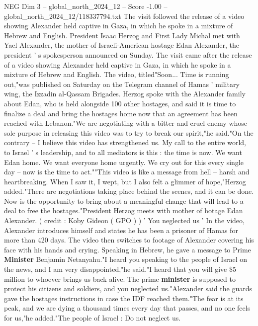 \begin{textsample}{NEG Dim 3 – global\_north\_2024\_12 – Score -1.00 – global\_north\_2024\_12/118337794.txt}  \label{ex:f3_neg_226}
The visit followed the release of a video showing Alexander held captive in Gaza, in which he spoke in a mixture of Hebrew and English.
President Isaac Herzog and First Lady Michal met with Yael Alexander, the mother of Israeli-American hostage Edan Alexander, the president ' s spokesperson announced on Sunday.
The visit came after the release of a video showing Alexander held captive in Gaza, in which he spoke in a mixture of Hebrew and English.
The video, titled"Soon...
Time is running out,"was published on Saturday on the Telegram channel of Hamas ' military wing, the Izzadin al-Qassam Brigades.
Herzog spoke with the Alexander family about Edan, who is held alongside 100 other hostages, and said it is time to finalize a deal and bring the hostages home now that an agreement has been reached with Lebanon."We are negotiating with a bitter and cruel enemy whose sole purpose in releasing this video was to try to break our spirit,"he said."On the contrary -- I believe this video has strengthened us.
My call to the entire world, to Israel ' s leadership, and to all mediators is this : the time is now.
We want Edan home.
We want everyone home urgently.
We cry out for this every single day -- now is the time to act.""This video is like a message from hell -- harsh and heartbreaking.
When I saw it, I wept, but I also felt a glimmer of hope,"Herzog added."There are negotiations taking place behind the scenes, and it can be done.
Now is the opportunity to bring about a meaningful change that will lead to a deal to free the hostages."President Herzog meets with mother of hotage Edan Alexander. ( credit : Koby Gideon ( GPO ) ) ' You neglected us ' In the video, Alexander introduces himself and states he has been a prisoner of Hamas for more than 420 days.
The video then switches to footage of Alexander covering his face with his hands and crying.
Speaking in Hebrew, he gave a message to Prime \textbf{Minister} Benjamin Netanyahu."I heard you speaking to the people of Israel on the news, and I am very disappointed,"he said."I heard that you will give \$5 million to whoever brings us back alive.
The prime \textbf{minister} is supposed to protect his citizens and soldiers, and you neglected us."Alexander said the guards gave the hostages instructions in case the IDF reached them."The fear is at its peak, and we are dying a thousand times every day that passes, and no one feels for us,"he added."The people of Israel : Do not neglect us.

\end{textsample}
